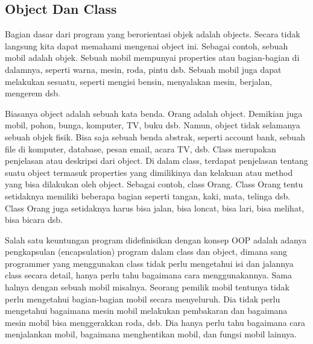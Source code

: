 \subsection{ Object Dan Class}
Bagian dasar dari program yang berorientasi objek adalah objects. Secara tidak langsung  kita dapat memahami mengenai object ini. Sebagai contoh, sebuah mobil adalah objek. Sebuah mobil mempunyai properties atau bagian-bagian di dalamnya, seperti warna, mesin, roda, pintu dsb. Sebuah mobil juga dapat melakukan sesuatu, seperti mengisi bensin, menyalakan mesin, berjalan, mengerem dsb. 
\par
Biasanya object adalah sebuah kata benda. Orang adalah object. Demikian juga mobil, pohon, bunga, komputer, TV, buku dsb. Namun, object tidak selamanya sebuah objek fisik. Bisa saja sebuah benda abstrak, seperti account bank, sebuah file di komputer, database, pesan email, acara TV, dsb. 
Class merupakan penjelasan atau deskripsi dari object. Di dalam class, terdapat penjelasan tentang suatu object termasuk properties yang dimilikinya dan kelakuan atau method yang bisa dilakukan oleh object. Sebagai contoh, class Orang. Class Orang tentu setidaknya memiliki beberapa bagian seperti tangan, kaki, mata, telinga dsb. Class Orang juga setidaknya harus bisa jalan, bisa loncat, bisa lari, bisa melihat, bisa bicara dsb. 
\par
Salah satu keuntungan program didefinisikan dengan konsep OOP adalah adanya pengkapsulan (encapsulation) program dalam class dan object, dimana sang programmer yang menggunakan class tidak perlu mengetahui isi dan jalannya class secara detail, hanya perlu tahu bagaimana cara menggunakannya. Sama halnya dengan sebuah mobil misalnya. Seorang pemilik mobil tentunya tidak perlu mengetahui bagian-bagian mobil secara menyeluruh. Dia tidak perlu mengetahui bagaimana mesin mobil melakukan pembakaran dan bagaimana mesin mobil bisa menggerakkan roda, dsb. Dia hanya perlu tahu bagaimana cara menjalankan mobil, bagaimana menghentikan mobil, dan fungsi mobil lainnya. 

